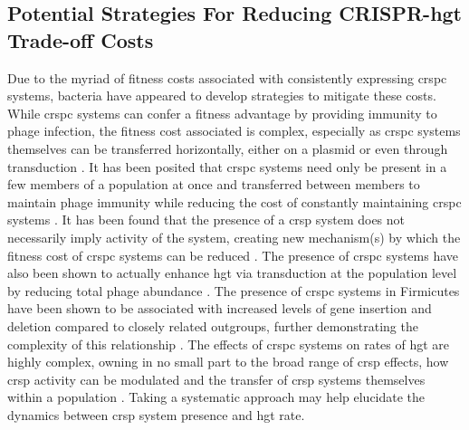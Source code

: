 \subsection{Potential Strategies For Reducing CRISPR-\ac{hgt} Trade-off Costs}
Due to the  myriad of fitness costs associated with consistently expressing \ac{crspc} systems, bacteria have appeared to develop strategies to mitigate these costs.
While \ac{crspc} systems can confer a fitness advantage by providing immunity to phage infection, the fitness cost associated is complex, especially as \ac{crspc} systems  themselves can be transferred  horizontally, either on a plasmid or even through transduction \citep{crisprlgt}.
It has been posited that \ac{crspc} systems need only be present in a few members of a population at once and transferred between members to maintain phage immunity while reducing the cost of constantly maintaining \ac{crspc} systems \citep{acqorres}.
It has been found that the presence of a \ac{crsp} system does not necessarily imply activity of the system, creating new mechanism(s) by which the fitness cost of \ac{crspc} systems can be reduced \citep{acqorres}.
The presence of \ac{crspc} systems have also been shown to actually enhance \ac{hgt} via transduction at the population level by reducing total phage abundance \citep{transhgt}.
The presence of \ac{crspc} systems in Firmicutes have been shown to be associated with increased levels of gene insertion and deletion compared to closely related outgroups, further demonstrating the complexity of this relationship \citep{athena}.
The effects of \ac{crspc} systems on rates of \ac{hgt} are highly complex, owning in no small part to the broad range of \ac{crsp} effects, how \ac{crsp} activity can be modulated and the transfer of \ac{crsp} systems themselves within a population \citep{acqorres}.
Taking a systematic approach may help elucidate the dynamics between \ac{crsp} system presence and \ac{hgt} rate.
